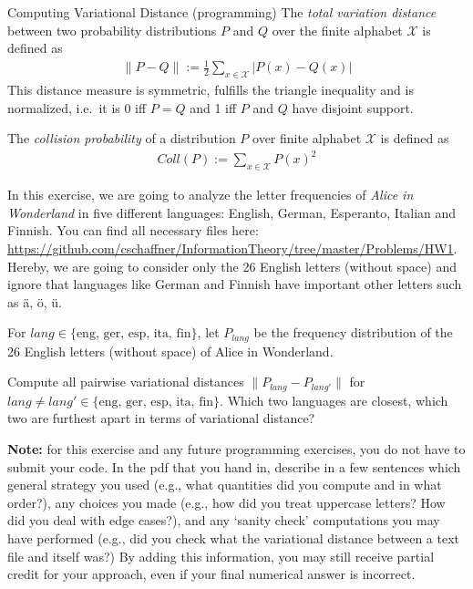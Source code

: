 \documentclass[a4paper,10pt]{article}
\begin{document}


\newcommand{\lang}{\textit{lang}}
\newcommand{\coll}{\textit{coll}}

\begin{nproblem}{8}{Computing Variational Distance (programming)}
The \emph{total variation distance} between two probability distributions $P$ and $Q$
over the finite alphabet $\mathcal{X}$ is defined as
\begin{align*}
\| P - Q \| := \frac12 \sum_{x \in \mathcal{X} } | P(x) - Q(x) |
\end{align*}
This distance measure is symmetric, fulfills the triangle inequality and is normalized, i.e.\ it is 0 iff $P=Q$ and 1 iff $P$ and $Q$ have disjoint support.

The \emph{collision probability} of a distribution $P$ over finite alphabet $\mathcal{X}$ is defined as
\begin{align*}
Coll(P) := \sum_{x \in \mathcal{X}} P(x)^2
\end{align*}

In this exercise, we are going to analyze the letter frequencies of \emph{Alice in
  Wonderland} in five different languages: English, German, Esperanto,
Italian and Finnish. You can find all necessary files here: \url{https://github.com/cschaffner/InformationTheory/tree/master/Problems/HW1}. Hereby, we are going to consider only the 26 English letters (without space) and ignore that languages like German and Finnish have important other letters such as {\"a}, {\"o}, {\"u}.

For $\lang \in \{ \textrm{eng, ger, esp, ita, fin} \}$, let $P_{\lang}$ be the frequency distribution of the 26 English letters (without space) of Alice in Wonderland.

\begin{subproblem}{2}
Compute all pairwise variational distances $\| P_{\lang} - P_{\lang'} \|$ for $\lang \neq \lang' \in \{ \textrm{eng, ger, esp, ita, fin} \}$. Which two languages are closest, which two are furthest apart in terms of variational distance?

\textbf{Note:} for this exercise and any future programming exercises, you do not have to submit your code. In the pdf that you hand in, describe in a few sentences which general strategy you used (e.g., what quantities did you compute and in what order?), any choices you made (e.g., how did you treat uppercase letters? How did you deal with edge cases?), and any `sanity check' computations you may have performed (e.g., did you check what the variational distance between a text file and itself was?) By adding this information, you may still receive partial credit for your approach, even if your final numerical answer is incorrect.
\end{subproblem}
\begin{solution}


\end{solution}
\end{nproblem}
\end{document}
